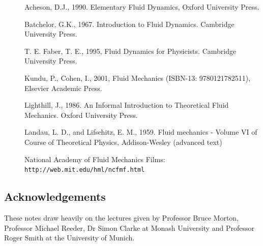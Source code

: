 \documentclass[10pt]{report}
\begin{document}
\begin{description}
\item[]Acheson, D.J., 1990. Elementary Fluid Dynamics, Oxford University Press.
\item[]Batchelor, G.K., 1967. Introduction to Fluid Dynamics. Cambridge University Press.
\item[]T. E. Faber, T. E., 1995, Fluid Dynamics for Physicists. Cambridge University Press.
\item[]Kundu, P., Cohen, I., 2001, Fluid Mechanics (ISBN-13: 9780121782511), Elsevier Academic Press.
\item[]Lighthill, J., 1986. An Informal Introduction to Theoretical Fluid Mechanics. Oxford University Press.
\item[]Landau, L. D., and Lifschitz, E. M., 1959.  Fluid mechanics - Volume VI of Course of Theoretical Physics, Addison-Wesley (advanced text)
\item[] National Academy of Fluid Mechanics Films: \texttt{http://web.mit.edu/hml/ncfmf.html}
\end{description}

\subsection*{Acknowledgements}

These notes draw heavily on the lectures given by Professor Bruce Morton,
Professor Michael Reeder, Dr Simon Clarke at Monash University and
Professor Roger Smith at the University of Munich.
\end{document}
